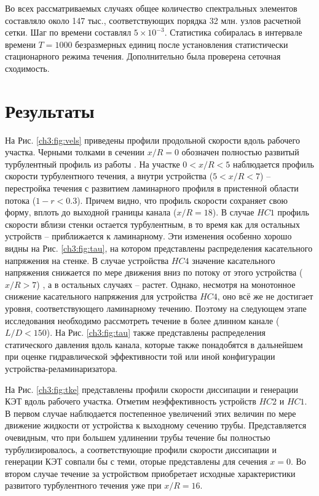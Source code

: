 Во всех рассматриваемых случаях общее количество спектральных элементов составляло около 147 тыс., 
соответствующих порядка 32 млн. узлов расчетной сетки. 
%
Шаг по времени составлял $5\times10^{-3}$. 
%
Статистика собиралась в интервале времени $T = 1000$ безразмерных единиц 
после установления статистически стационарного режима течения. 
%
Дополнительно была проверена сеточная сходимость.
%

\section{Результаты}\label{ch3:results}
%
На Рис. \ref{ch3:fig:vels} приведены профили продольной скорости вдоль рабочего участка. 
%
Черными толками в сечении $x/R = 0$ обозначен полностью развитый турбулентный 
профиль из работы \cite{el2014turbulent}. 
%
На участке $0 < x/R < 5$ наблюдается профиль скорости турбулентного течения, 
а внутри устройства ($5 < x/R < 7$) -- перестройка течения с развитием ламинарного профиля 
в пристенной области потока ($1-r < 0.3$). 
%
Причем видно, что профиль скорости сохраняет свою форму, вплоть до выходной границы канала ($x/R = 18$). 
%
В случае $HC1$ профиль скорости вблизи стенки остается турбулентным, 
в то время как для остальных устройств -- приближается к ламинарному. 
%
Эти изменения особенно хорошо видны на Рис. \ref{ch3:fig:tau}, 
на котором представлены распределения касательного напряжения на стенке. 
%
В случае устройства $HC4$ значение касательного напряжения снижается 
по мере движения вниз по потоку от этого устройства ($x/R > 7$) , а в остальных случаях -- растет. 
%
Однако, несмотря на монотонное снижение касательного напряжения 
для устройства $HC4$, оно всё же не достигает уровня, соответствующего ламинарному течению. 
%
Поэтому на следующем этапе исследования необходимо рассмотреть течение в более длинном канале ($L/D < 150$). 
%
На Рис. \ref{ch3:fig:tau} также представлены распределения статического давления вдоль канала, 
которые также понадобятся в дальнейшем при оценке гидравлической эффективности той или иной 
конфигурации устройства-реламинаризатора.
%


%
На Рис. \ref{ch3:fig:tke} представлены профили скорости диссипации и генерации КЭТ вдоль рабочего участка. 
%
Отметим неэффективность устройств $HC2$ и $HC1$. 
%
В первом случае наблюдается постепенное увеличений этих величин по мере движение жидкости 
от устройства к выходному сечению трубы. 
%
Представляется очевидным, что при большем удлинении трубы течение бы полностью турбулизировалось, 
а соответствующие профили скорости диссипации и генерации КЭТ совпали бы с теми, 
оторые представлены для сечения $x = 0$. 
%
Во втором случае течение за устройством приобретает исходные характеристики развитого турбулентного течения 
уже при $x/R = 16$.
%



